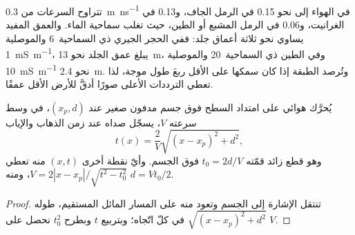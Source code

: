 تتراوح السرعات من \qty{0.3}{m.ns^{-1}} في الهواء إلى نحو \num{0.15} في
الرمل الجاف، و\num{0.13} في الغرانيت، و\num{0.06} في الرمل المشبع أو
الطين، حيث تغلب سماحية الماء. والعمق المفيد
يساوي نحو ثلاثة أعماق جلد: ففي الحجر الجيري ذي السماحية~6
والموصلية \qty{1}{mS.m^{-1}}، يبلغ عمق الجلد نحو \qty{13}{m}،
وفي الطين ذي السماحية~20 والموصلية \qty{10}{mS.m^{-1}} نحو
\qty{2.4}{m}. وتُرصد الطبقة إذا كان سمكها على الأقل ربعَ
طول موجة، لذا تعطي الترددات الأعلى صورًا أدقَّ
للأرض الأقل عمقًا.

\begin{proposition}\label{prop:b3:field-lab-methods-3:hyperbola}
يُحرَّك هوائي على امتداد السطح فوق جسم مدفون صغير عند
$(x_p, d)$، في وسط سرعته $V$، يسجّل صداه عند
زمن الذهاب والإياب
\[
t(x) = \frac{2}{V}\sqrt{(x - x_p)^2 + d^2} ,
\]
وهو قطع زائد قمّته $t_0 = 2d/V$ فوق الجسم. وأيّ نقطة أخرى
$(x, t)$ منه تعطي $V = 2|x - x_p|/\sqrt{t^2 - t_0^2}$، ومنه $d =
Vt_0/2$.
\end{proposition}

\begin{proof}
تنتقل الإشارة إلى الجسم وتعود منه على المسار المائل المستقيم،
طوله $\sqrt{(x - x_p)^2 + d^2}$ في كلّ اتّجاه؛ وبتربيع $t$
وبطرح $t_0^2$ نحصل على $V$.
\end{proof}

